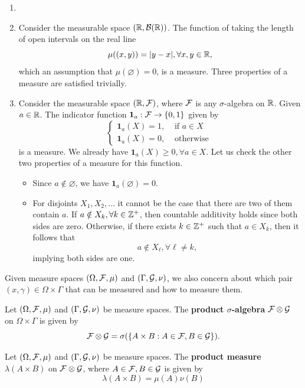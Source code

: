 \begin{example}
 \begin{enumerate}
  \item []
  \item Consider the measurable space $(\mathbb{R}, \mathcal{B}(\mathbb{R}))  $. The function of taking the length of open intervals on the real line
        $$\mu((x,y))=|y-x|,\forall x,y\in\mathbb{R},$$
        which an assumption that $\mu(\varnothing)=0$, is a measure. Three properties of a measure are satisfied trivially.
  \item Consider the measurable space $(\mathbb{R}, \mathcal{F})$, where $\mathcal{F}$ is any $\sigma$-algebra on $\mathbb{R}$. Given $a\in\mathbb{R}$. The indicator function $\mathbf{1}_a: \mathcal{F}\to\{0,1\}$ given by
        $$\begin{cases}
          \mathbf{1}_a(X)=1, & \text{ if } a\in X \\
          \mathbf{1}_a(X)=0, & \text{ otherwise }
         \end{cases}$$
        is a measure. We already have $\mathbf{1}_a(X)\ge0, \forall a\in X$. Let us check the other two properties of a measure for this function.
        \begin{itemize}
         \item Since $a\notin\varnothing$, we have $\mathbf{1}_a(\varnothing)=0$.
         \item For disjoints $X_1,X_2,\ldots$ it cannot be the case that there are two of them contain $a$. If $a\notin X_k,\forall k\in\mathbb{Z}^+$, then countable additivity holds since both sides are zero. Otherwise, if there exists $k\in \mathbb{Z}^+$ such that $a\in X_k$, then it follows that $$a\notin X_\ell, \forall \ell\ne k,$$ implying both sides are one.
        \end{itemize}
 \end{enumerate}
\end{example}

Given measure spaces $(\Omega,\mathcal{F},\mu)$ and $(\Gamma,\mathcal{G},\nu)$, we also concern about which pair $(x,\gamma)\in\Omega\times\Gamma$ that can be measured and how to measure them.

\begin{definition}
 Let $(\Omega,\mathcal{F},\mu)$ and $(\Gamma,\mathcal{G},\nu)$ be measure spaces. The \textbf{product $\sigma$-algebra} $\mathcal{F}\otimes\mathcal{G}$ on $\Omega\times\Gamma$ is given by
 $$\mathcal{F}\otimes\mathcal{G}=\sigma(\{A\times B : A\in\mathcal{F},B\in\mathcal{G}\}).$$
\end{definition}

\begin{definition}
 Let $(\Omega,\mathcal{F},\mu)$ and $(\Gamma,\mathcal{G},\nu)$ be measure spaces. The \textbf{product measure} $\lambda(A\times B)$ on $\mathcal{F}\otimes\mathcal{G}$, where $A\in\mathcal{F},B\in\mathcal{G}$ is given by
 $$\lambda(A\times B)=\mu(A)\nu(B)$$
\end{definition}

